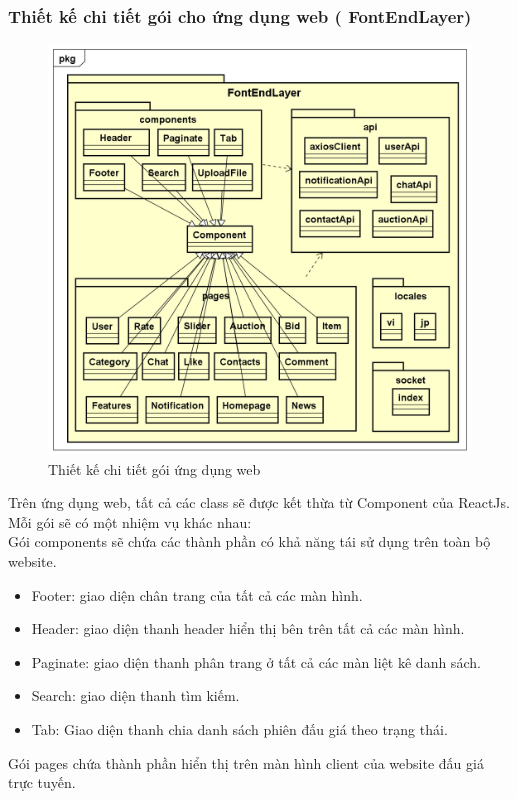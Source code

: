 \documentclass[../DoAn.tex]{subfiles}
\begin{document}
\subsubsection{Thiết kế chi tiết gói cho ứng dụng web ( FontEndLayer)
} \mbox{}
\begin{figure}[H]
    \centering
    \includegraphics[width=0.75\linewidth,height=10.87cm]{Hinhve/FontEndLayer752.png}
    \caption{Thiết kế chi tiết gói ứng dụng web}
    \label{fig:Fig44}
\end{figure}
Trên ứng dụng web, tất cả các class sẽ được kết thừa từ Component của ReactJs.\\
Mỗi gói sẽ có một nhiệm vụ khác nhau: \\
Gói components sẽ chứa các thành phần có khả năng tái sử dụng trên toàn bộ website.
\begin{itemize}
    \item Footer: giao diện chân trang của tất cả các màn hình.
    \item Header: giao diện thanh header hiển thị bên trên tất cả các màn hình.
    \item Paginate: giao diện thanh phân trang ở tất cả các màn liệt kê danh sách.
    \item Search: giao diện thanh tìm kiếm.
    \item Tab: Giao diện thanh chia danh sách phiên đấu giá theo trạng thái.
\end{itemize}
Gói pages chứa thành phần hiển thị trên màn hình client của website đấu giá trực tuyến.
\end{document}
